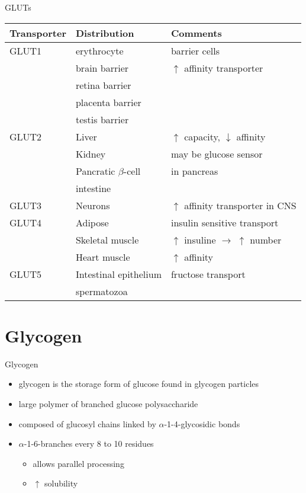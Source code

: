 \documentclass[presentation, smaller]{beamer}
\begin{document}
\begin{frame}[label={sec:orge7bf13f}]{GLUTs}
\begin{center}
\begin{tabular}{lll}
Transporter & Distribution & Comments\\
\hline
GLUT1 & erythrocyte & barrier cells\\
 & brain barrier & \(\uparrow\) affinity transporter\\
 & retina barrier & \\
 & placenta barrier & \\
 & testis barrier & \\
\hline
GLUT2 & Liver & \(\uparrow\) capacity, \(\downarrow\) affinity\\
 & Kidney & may be glucose sensor\\
 & Pancratic \(\beta\)-cell & in pancreas\\
 & intestine & \\
\hline
GLUT3 & Neurons & \(\uparrow\) affinity  transporter in CNS\\
\hline
GLUT4 & Adipose & insulin sensitive transport\\
 & Skeletal muscle & \(\uparrow\) insuline \(\to\) \(\uparrow\) number\\
 & Heart muscle & \(\uparrow\) affinity\\
\hline
GLUT5 & Intestinal epithelium & fructose transport\\
 & spermatozoa & \\
\end{tabular}
\end{center}
\end{frame}

\section{Glycogen}
\label{sec:orge374b8c}

\begin{frame}[label={sec:orga7e78c9}]{Glycogen}
\begin{itemize}
\item glycogen is the storage form of glucose found in glycogen particles
\item large polymer of branched glucose polysaccharide
\item composed of glucosyl chains linked by \(\alpha\)-1-4-glycosidic bonds
\item \(\alpha\)-1-6-branches every 8 to 10 residues
\begin{itemize}
\item allows parallel processing
\item \(\uparrow\) solubility
\end{itemize}
\end{itemize}
\end{frame}
\end{document}
